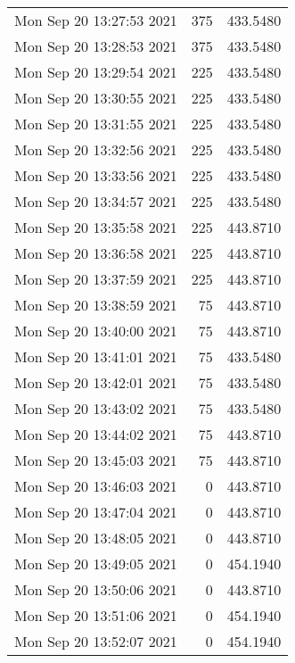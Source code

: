 \begin{longtable}{lrr}
Mon Sep 20 13:27:53 2021 &                375 &        433.5480 \\
Mon Sep 20 13:28:53 2021 &                375 &        433.5480 \\
Mon Sep 20 13:29:54 2021 &                225 &        433.5480 \\
Mon Sep 20 13:30:55 2021 &                225 &        433.5480 \\
Mon Sep 20 13:31:55 2021 &                225 &        433.5480 \\
Mon Sep 20 13:32:56 2021 &                225 &        433.5480 \\
Mon Sep 20 13:33:56 2021 &                225 &        433.5480 \\
Mon Sep 20 13:34:57 2021 &                225 &        433.5480 \\
Mon Sep 20 13:35:58 2021 &                225 &        443.8710 \\
Mon Sep 20 13:36:58 2021 &                225 &        443.8710 \\
Mon Sep 20 13:37:59 2021 &                225 &        443.8710 \\
Mon Sep 20 13:38:59 2021 &                 75 &        443.8710 \\
Mon Sep 20 13:40:00 2021 &                 75 &        443.8710 \\
Mon Sep 20 13:41:01 2021 &                 75 &        433.5480 \\
Mon Sep 20 13:42:01 2021 &                 75 &        433.5480 \\
Mon Sep 20 13:43:02 2021 &                 75 &        433.5480 \\
Mon Sep 20 13:44:02 2021 &                 75 &        443.8710 \\
Mon Sep 20 13:45:03 2021 &                 75 &        443.8710 \\
Mon Sep 20 13:46:03 2021 &                  0 &        443.8710 \\
Mon Sep 20 13:47:04 2021 &                  0 &        443.8710 \\
Mon Sep 20 13:48:05 2021 &                  0 &        443.8710 \\
Mon Sep 20 13:49:05 2021 &                  0 &        454.1940 \\
Mon Sep 20 13:50:06 2021 &                  0 &        443.8710 \\
Mon Sep 20 13:51:06 2021 &                  0 &        454.1940 \\
Mon Sep 20 13:52:07 2021 &                  0 &        454.1940 \\

\end{longtable}
